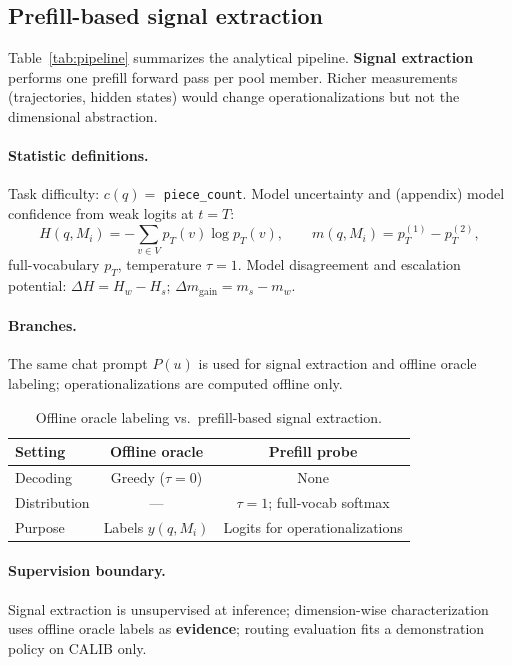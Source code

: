 \subsection{Prefill-based signal extraction}
\label{sec:method:extraction}

Table~\ref{tab:pipeline} summarizes the analytical pipeline.
\textbf{Signal extraction} performs one prefill forward pass per pool member.
Richer measurements (trajectories, hidden states) would change operationalizations but not the dimensional abstraction.



\paragraph{Statistic definitions.}
\label{sec:method:prefill}
Task difficulty: $c(q)=$ \texttt{piece\_count}.
Model uncertainty and (appendix) model confidence from weak logits at $t{=}T$:
\begin{equation}
H(q,M_i) = -\sum_{v \in V} p_T(v)\log p_T(v), \qquad
m(q,M_i) = p_T^{(1)} - p_T^{(2)},
\end{equation}
full-vocabulary $p_T$, temperature $\tau{=}1$.
Model disagreement and escalation potential:
$\Delta H = H_w - H_s$; $\Delta m_{\mathrm{gain}} = m_s - m_w$.

\paragraph{Branches.}
The same chat prompt $P(u)$ is used for signal extraction and offline oracle labeling; operationalizations are computed offline only.

\begin{table}[t]
  \centering
  \small
  \begin{tabular}{lcc}
    \toprule
    \textbf{Setting} & \textbf{Offline oracle} & \textbf{Prefill probe} \\
    \midrule
    Decoding & Greedy ($\tau{=}0$) & None \\
    Distribution & --- & $\tau{=}1$; full-vocab softmax \\
    Purpose & Labels $y(q,M_i)$ & Logits for operationalizations \\
    \bottomrule
  \end{tabular}
  \caption{Offline oracle labeling vs.\ prefill-based signal extraction.}
  \label{tab:oracle-vs-probe}
\end{table}

\paragraph{Supervision boundary.}
\label{sec:method:supervision}
Signal extraction is unsupervised at inference; dimension-wise characterization uses offline oracle labels as \textbf{evidence}; routing evaluation fits a demonstration policy on CALIB only.

